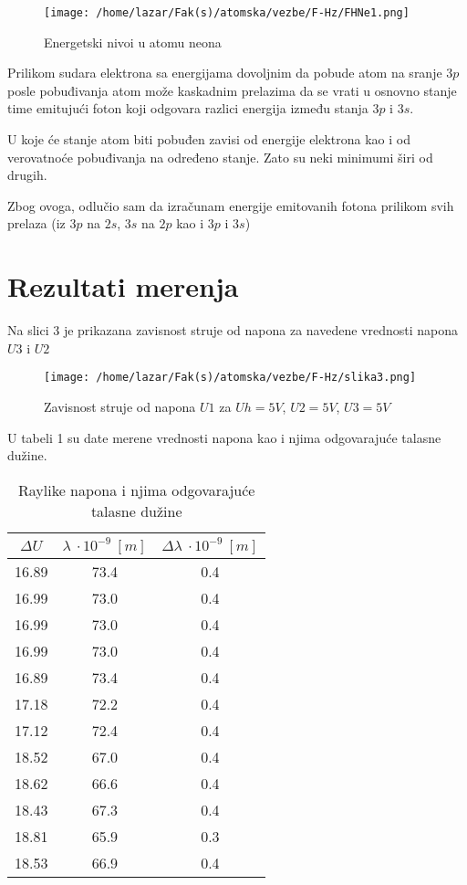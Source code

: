 \documentclass[12pt,a4paper]{article}
\begin{document}
\begin{figure}[H]
\centering
\texttt{[image: /home/lazar/Fak(s)/atomska/vezbe/F-Hz/FHNe1.png]}
\caption{Energetski nivoi u atomu neona}
\end{figure}

Prilikom sudara elektrona sa energijama dovoljnim da pobude atom na sranje $3p$ posle pobuđivanja atom može kaskadnim prelazima da se vrati u osnovno stanje time emitujući foton koji odgovara razlici energija između stanja $3p$ i $3s$.

U koje će stanje atom biti pobuđen zavisi od energije elektrona kao i od verovatnoće pobuđivanja na određeno stanje. Zato su neki minimumi širi od drugih. 

Zbog ovoga, odlučio sam da izračunam energije emitovanih fotona prilikom svih prelaza (iz $3p$ na $2s$, $3s$ na $2p$ kao i $3p$ i $3s$)


\pagebreak


\section*{Rezultati merenja}
Na slici 3 je prikazana zavisnost struje od napona za navedene vrednosti napona $U3$ i $U2$

\begin{figure}[H]
\centering
\texttt{[image: /home/lazar/Fak(s)/atomska/vezbe/F-Hz/slika3.png]}
\caption{Zavisnost struje od napona $U1$ za $Uh=5V$, $U2=5V$, $U3=5V$}
\end{figure}

U tabeli 1 su date merene vrednosti napona kao i njima odgovarajuće talasne dužine.
\begin{table}[H]
\centering

\begin{tabular}{|c|c|c|}
\hline
$\Delta U$ & $\lambda\ \cdot 10^{-9}\ [m]$ & $\Delta \lambda\ \cdot 10^{-9}\ [m]$ \\
\hline
 16.89 & 73.4 & 0.4 \\
 16.99 & 73.0 & 0.4 \\
 16.99 & 73.0 & 0.4 \\
 16.99 & 73.0 & 0.4 \\
 16.89 & 73.4 & 0.4 \\
 17.18 & 72.2 & 0.4 \\
 17.12 & 72.4 & 0.4 \\
\hline

 18.52 & 67.0 & 0.4 \\
 18.62 & 66.6 & 0.4 \\
 18.43 & 67.3 & 0.4 \\
 18.81 & 65.9 & 0.3 \\
 18.53 & 66.9 & 0.4 \\
\hline
\end{tabular}

\caption{\label{tab:widgets}Raylike napona i njima odgovarajuće talasne dužine}
\end{table}
\end{document}
